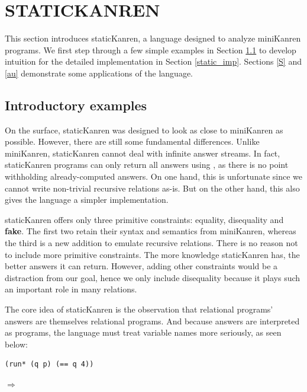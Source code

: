 \section{STATICKANREN}\label{static}
This section introduces staticKanren, a language designed to analyze miniKanren programs. We first step through a few simple examples in Section \ref{static_intro} to develop intuition for the detailed implementation in Section \ref{static_imp}. Sections \ref{S} and \ref{au} demonstrate some applications of the language.

\subsection{Introductory examples}\label{static_intro}
On the surface, staticKanren was designed to look as close to miniKanren as possible. However, there are still some fundamental differences. Unlike miniKanren, staticKanren cannot deal with infinite answer streams. In fact, staticKanren programs can only return all answers using , as there is no point withholding already-computed answers. On one hand, this is unfortunate since we cannot write non-trivial recursive relations as-is. But on the other hand, this also gives the language a simpler implementation.

staticKanren offers only three primitive constraints: equality, disequality and \textbf{fake}. The first two retain their syntax and semantics from miniKanren, whereas the third is a new addition to emulate recursive relations. There is no reason not to include more primitive constraints. The more knowledge staticKanren has, the better answers it can return. However, adding other constraints would be a distraction from our goal, hence we only include disequality because it plays such an important role in many relations.

The core idea of staticKanren is the observation that relational programs' answers are themselves relational programs. And because answers are interpreted as programs, the language must treat variable names more seriously, as seen below:

\begin{lstlisting}
(run* (q p) (== q 4))
\end{lstlisting}
$\Rightarrow$ 

